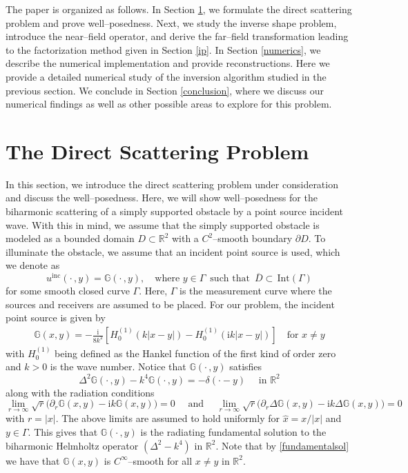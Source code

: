 \documentclass{article}
\newcommand{\R}{\mathbb{R}}
\newcommand{\pdr}{\partial_r}
\numberwithin{equation}{section}
\begin{document}
The paper is organized as follows. In Section \ref{dp}, we formulate the direct scattering problem and prove well--posedness. Next, we study the inverse shape problem, introduce the near--field operator, and derive the far--field transformation leading to the factorization method given in Section \ref{ip}. In Section \ref{numerics}, we describe the numerical implementation and provide reconstructions. Here we provide a detailed numerical study of the inversion algorithm studied in the previous section. We conclude in Section \ref{conclusion}, where we discuss our numerical findings as well as other possible areas to explore for this problem.


\section{The Direct Scattering Problem}\label{dp}
In this section, we introduce the direct scattering problem under consideration and discuss the well--posedness. Here, we will show well--posedness for the biharmonic scattering of a simply supported obstacle by a point source incident wave. With this in mind, we assume that the simply supported obstacle is modeled as a bounded domain $D \subset \R^2$ with a $C^2$--smooth boundary $\partial D$. To illuminate the obstacle, we assume that an incident point source is used, which we denote as 
$$u^{\text{inc}}( \cdot  \, , y) = \mathbb{G} ( \cdot  \, , y),\quad  \text{where $y \in \Gamma$} \,\,\,  \text{such that} \,\, \, \overline{D} \subset\,\text{Int}(\Gamma)$$
for some smooth closed curve $\Gamma$. 
Here, $\Gamma$ is the measurement curve where the sources and receivers are assumed to be placed. For our problem, the incident point source is given by
\begin{align}\label{fundamentalsol}
\mathbb{G}(x,y) = - \frac{\text{i}}{8k^2} \left[ H^{(1)}_0(k|x-y|) -  H^{(1)}_0(\text{i}k|x-y|)\right] \quad \text{for $x\neq y$}
\end{align}
with $H^{(1)}_0$ being defined as the Hankel function of the first kind of order zero and $k>0$ is the wave number. Notice that $\mathbb{G}( \cdot \, , y)$ satisfies 
$$\Delta^2 \mathbb{G} ( \cdot  \, , y) - k^4\mathbb{G} ( \cdot  \, , y) = -\delta( \cdot - y) \quad \text{ in $\R^2$}$$
along with the radiation conditions
$$\lim_{r \to \infty} \sqrt{r} \big(\pdr{\mathbb{G}(x,y)} - \text{i} k \mathbb{G}(x,y)\big) = 0 \quad \text{ and } \quad \lim_{r \to \infty} \sqrt{r}\big(\pdr{ \Delta \mathbb{G}(x,y)} - \text{i} k \Delta \mathbb{G}(x,y)\big) = 0$$
with $r=|x|$. The above limits are assumed to hold uniformly for $\hat{x}=x/|x|$ and $y \in \Gamma$. This gives that $\mathbb{G}( \cdot \, , y)$ is the radiating fundamental solution to the biharmonic Helmholtz operator $(\Delta^2 -k^4)$ in $\R^2$. Note that by \eqref{fundamentalsol} we have that $\mathbb{G}(x,y)$ is $C^\infty$--smooth for all $x \neq y$ in $\R^2$. 
\end{document}
